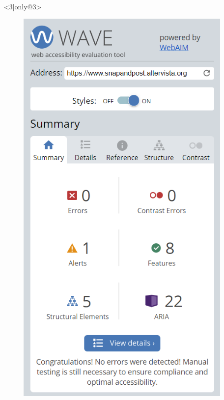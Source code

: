 \documentclass{beamer}
\begin{document}
\begin{frame}
\begin{columns}
\begin{itemize}
\begin{figure}[!h]
 		\end{figure}
 	\item[] <3|only@3> 
		\begin{figure}[!h]
 			\centering
 			\includegraphics[scale=0.36]{"Immagini/accessibility.png"}
 		\end{figure}
\end{itemize}
\end{columns}
\end{frame}
\end{document}
